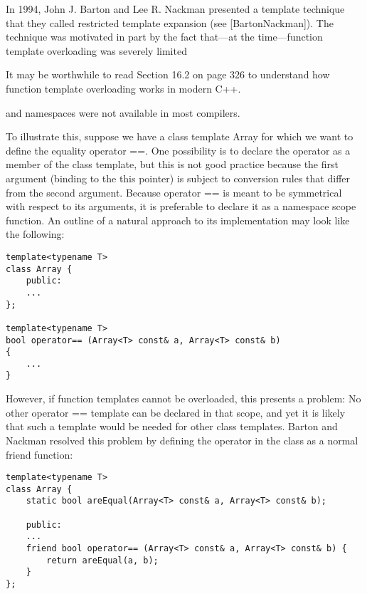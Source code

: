 
In 1994, John J. Barton and Lee R. Nackman presented a template technique that they called restricted 
template expansion (see [BartonNackman]). The technique was motivated in part by the fact that—at the time—function template overloading was severely limited

\begin{tcolorbox}[colback=webgreen!5!white,colframe=webgreen!75!black]
\hspace*{0.75cm}It may be worthwhile to read Section 16.2 on page 326 to understand how function template overloading works in modern C++.
\end{tcolorbox}

and namespaces were not available in most compilers.

To illustrate this, suppose we have a class template Array for which we want to define the equality operator ==. One possibility is to declare the operator as a member of the class template, but this is not good practice because the first argument (binding to the this pointer) is subject to conversion rules that differ from the second argument. Because operator == is meant to be symmetrical with respect to its arguments, it is preferable to declare it as a namespace scope function. An outline of a natural approach to its implementation may look like the following:

\begin{lstlisting}[style=styleCXX]
template<typename T>
class Array {
	public:
	...
};

template<typename T>
bool operator== (Array<T> const& a, Array<T> const& b)
{
	...
}
\end{lstlisting}

However, if function templates cannot be overloaded, this presents a problem: No other operator == template can be declared in that scope, and yet it is likely that such a template would be needed for other class templates. Barton and Nackman resolved this problem by defining the operator in the class as a normal friend function:

\begin{lstlisting}[style=styleCXX]
template<typename T>
class Array {
	static bool areEqual(Array<T> const& a, Array<T> const& b);
	
	public:
	...
	friend bool operator== (Array<T> const& a, Array<T> const& b) {
		return areEqual(a, b);
	}
};
\end{lstlisting}

